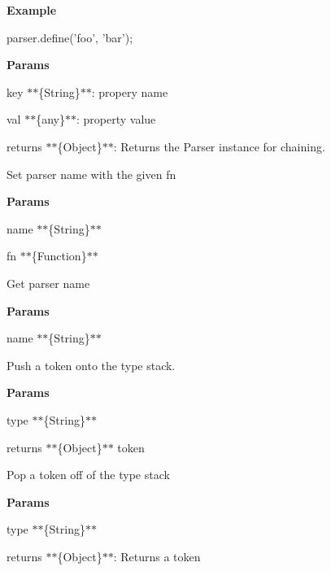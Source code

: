 {\bfseries Example}


\begin{DoxyCode}
parser.define('foo', 'bar');
\end{DoxyCode}


{\bfseries Params}


\begin{DoxyItemize}
\item {\ttfamily key} $\ast$$\ast$\{String\}$\ast$$\ast$\+: propery name
\item {\ttfamily val} $\ast$$\ast$\{any\}$\ast$$\ast$\+: property value
\item {\ttfamily returns} $\ast$$\ast$\{Object\}$\ast$$\ast$\+: Returns the Parser instance for chaining.
\end{DoxyItemize}

Set parser {\ttfamily name} with the given {\ttfamily fn}

{\bfseries Params}


\begin{DoxyItemize}
\item {\ttfamily name} $\ast$$\ast$\{String\}$\ast$$\ast$
\item {\ttfamily fn} $\ast$$\ast$\{Function\}$\ast$$\ast$
\end{DoxyItemize}

Get parser {\ttfamily name}

{\bfseries Params}


\begin{DoxyItemize}
\item {\ttfamily name} $\ast$$\ast$\{String\}$\ast$$\ast$
\end{DoxyItemize}

Push a {\ttfamily token} onto the {\ttfamily type} stack.

{\bfseries Params}


\begin{DoxyItemize}
\item {\ttfamily type} $\ast$$\ast$\{String\}$\ast$$\ast$
\item {\ttfamily returns} $\ast$$\ast$\{Object\}$\ast$$\ast$ {\ttfamily token}
\end{DoxyItemize}

Pop a token off of the {\ttfamily type} stack

{\bfseries Params}


\begin{DoxyItemize}
\item {\ttfamily type} $\ast$$\ast$\{String\}$\ast$$\ast$
\item {\ttfamily returns} $\ast$$\ast$\{Object\}$\ast$$\ast$\+: Returns a token
\end{DoxyItemize}

